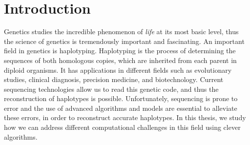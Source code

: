 \chapter{Introduction}



Genetics studies the incredible phenomenon of \textit{life} at its most basic level, thus the science of genetics is tremendously important and fascinating.
An important field in genetics is haplotyping.
Haplotyping is the process of determining the sequences of both homologous copies, which are inherited from each parent in diploid organisms.
It has applications in different fields such as evolutionary studies, clinical diagnosis, precision medicine, and biotechnology. 
Current sequencing technologies allow us to read this genetic code, and thus the reconstruction of haplotypes is
possible. Unfortunately, sequencing is prone to error and the use of advanced algorithms and models are essential to alleviate these errors, in order to reconstruct accurate haplotypes.  
In this thesis, we study how we can address different computational challenges in this field using clever algorithms.

